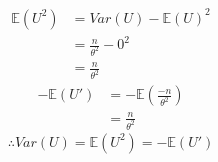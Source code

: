 \documentclass[a4paper]{article}
\begin{document}
		\begin{equation*}
			\begin{split}
				\mathbb{E}(U^2) &= Var(U) - \mathbb{E}(U)^2\\
				&= \frac{n}{\theta^2} - 0^2\\
				&= \frac{n}{\theta^2}
			\end{split}
		\end{equation*}
		\begin{equation*}
			\begin{split}
				-\mathbb{E}(U') &= -\mathbb{E}(\frac{-n}{\theta^2})\\
				&= \frac{n}{\theta^2}
			\end{split}
		\end{equation*}
		\[\therefore Var(U) = \mathbb{E}(U^2) = -\mathbb{E}(U')\]
\end{document}
